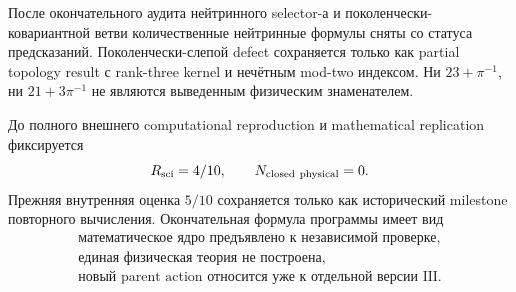 \documentclass[12pt,a4paper]{article}
\begin{document}
После окончательного аудита нейтринного selector-а и поколенчески-ковариантной
ветви количественные нейтринные формулы сняты со статуса предсказаний.
Поколенчески-слепой defect сохраняется только как partial topology result с
rank-three kernel и нечётным mod-two индексом. Ни \(23+\pi^{-1}\), ни
\(21+3\pi^{-1}\) не являются выведенным физическим знаменателем.

До полного внешнего computational reproduction и mathematical replication
фиксируется
\begin{equation}
 R_{\rm sci}=4/10,
 \qquad
 N_{\rm closed\ physical}=0.
\end{equation}
Прежняя внутренняя оценка \(5/10\) сохраняется только как исторический
milestone повторного вычисления. Окончательная формула программы имеет вид
\begin{equation}
 \boxed{
 \begin{gathered}
 \text{математическое ядро предъявлено к независимой проверке},\\
 \text{единая физическая теория не построена},\\
 \text{новый parent action относится уже к отдельной версии III}.
 \end{gathered}}
\end{equation}
\end{document}
